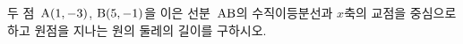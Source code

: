 두 점~$\mathrm{A}(1{,}\mkern3mu\mathopen{}-3)$, $\mathrm{B}(5{,}\mkern3mu\mathopen{}-1)$을 이은 선분~$\mathrm{AB}$의 수직이등분선과 $x$축의 교점을 중심으로 하고 원점을 지나는 원의 둘레의 길이를 구하시오.
